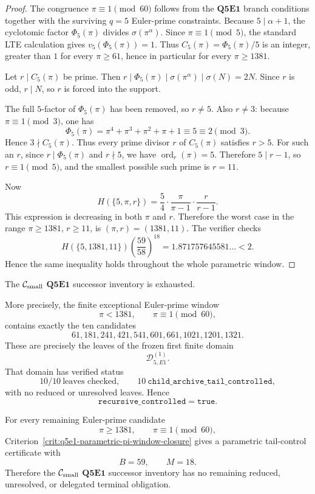 \begin{proof}
The congruence \(\pi\equiv1\pmod{60}\) follows from the \(\mathbf{Q5E1}\)
branch conditions together with the surviving \(q=5\) Euler-prime constraints.
Because \(5\mid\alpha+1\), the cyclotomic factor \(\Phi_5(\pi)\) divides
\(\sigma(\pi^\alpha)\).  Since \(\pi\equiv1\pmod5\), the standard LTE
calculation gives \(v_5(\Phi_5(\pi))=1\).  Thus
\(C_5(\pi)=\Phi_5(\pi)/5\) is an integer, greater than \(1\) for every
\(\pi\ge61\), hence in particular for every \(\pi\ge1381\).

Let \(r\mid C_5(\pi)\) be prime.  Then
\(r\mid\Phi_5(\pi)\mid\sigma(\pi^\alpha)\mid\sigma(N)=2N\).  Since \(r\) is
odd, \(r\mid N\), so \(r\) is forced into the support.

The full \(5\)-factor of \(\Phi_5(\pi)\) has been removed, so \(r\ne5\).
Also \(r\ne3\): because \(\pi\equiv1\pmod3\), one has
\[
  \Phi_5(\pi)
  =
  \pi^4+\pi^3+\pi^2+\pi+1
  \equiv
  5
  \equiv2
  \pmod3.
\]
Hence
\(3\nmid C_5(\pi)\).  Thus every prime divisor \(r\) of \(C_5(\pi)\) satisfies
\(r>5\).  For such an \(r\), since \(r\mid\Phi_5(\pi)\) and \(r\nmid5\), we
have \(\operatorname{ord}_r(\pi)=5\).  Therefore \(5\mid r-1\), so
\(r\equiv1\pmod5\), and the smallest possible such prime is \(r=11\).

Now
\[
  H(\{5,\pi,r\})
  =
  \frac54\cdot\frac{\pi}{\pi-1}\cdot\frac{r}{r-1}.
\]
This expression is decreasing in both \(\pi\) and \(r\).  Therefore the worst
case in the range \(\pi\ge1381\), \(r\ge11\), is \((\pi,r)=(1381,11)\).
The verifier checks
\[
  H(\{5,1381,11\})
  \left(\frac{59}{58}\right)^{18}
  =
  1.871757645581\ldots
  <2.
\]
Hence the same inequality holds throughout the whole parametric window.
\end{proof}

\begin{theorem}
\label{thm:q5e1-current-successor-inventory-closed}
The \(\mathcal C_{\mathrm{small}}\) \(\mathbf{Q5E1}\) successor inventory is exhausted.

More precisely, the finite exceptional Euler-prime window
\[
  \pi<1381,
  \qquad
  \pi\equiv1\pmod{60},
\]
contains exactly the ten candidates
\[
  61,181,241,421,541,601,661,1021,1201,1321.
\]
These are precisely the leaves of the frozen first finite domain
\[
  \mathcal D_{5,E1}^{(1)}.
\]
That domain has verified status
\[
  10/10\ \text{leaves checked},
  \qquad
  10\ \mathtt{child\_archive\_tail\_controlled},
\]
with no reduced or unresolved leaves.  Hence
\[
  \mathtt{recursive\_controlled}=\mathtt{true}.
\]

For every remaining Euler-prime candidate
\[
  \pi\ge1381,
  \qquad
  \pi\equiv1\pmod{60},
\]
Criterion~\ref{crit:q5e1-parametric-pi-window-closure} gives a parametric
tail-control certificate with
\[
  B=59,
  \qquad
  M=18.
\]
Therefore the \(\mathcal C_{\mathrm{small}}\) \(\mathbf{Q5E1}\) successor inventory has no remaining
reduced, unresolved, or delegated terminal obligation.
\end{theorem}


